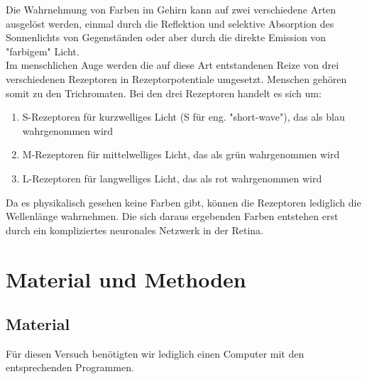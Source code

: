 \documentclass[11pt]{article}
\begin{document}
Die Wahrnehmung von Farben im Gehirn kann auf zwei verschiedene Arten ausgelöst werden, einmal durch die Reflektion und selektive Absorption des Sonnenlichts von Gegenständen  oder aber durch die direkte Emission von "{}farbigem"{} Licht. \\
Im menschlichen Auge werden die auf diese Art entstandenen Reize von drei verschiedenen Rezeptoren in Rezeptorpotentiale umgesetzt. Menschen gehören somit zu den Trichromaten. Bei den drei Rezeptoren handelt es sich um: 
\begin{enumerate}
\item S-Rezeptoren für kurzwelliges Licht (S für eng. "{}short-wave"{}), das als blau wahrgenommen wird
\item M-Rezeptoren für mittelwelliges Licht, das als grün wahrgenommen wird
\item L-Rezeptoren für langwelliges Licht, das als rot wahrgenommen wird
\end{enumerate}
Da es physikalisch gesehen keine Farben gibt, können die Rezeptoren lediglich die Wellenlänge wahrnehmen. Die sich daraus ergebenden Farben entstehen erst durch ein kompliziertes neuronales Netzwerk in der Retina. 

\section{Material und Methoden}
\subsection{Material}
Für diesen Versuch benötigten wir lediglich einen Computer mit den entsprechenden Programmen.
\end{document}
